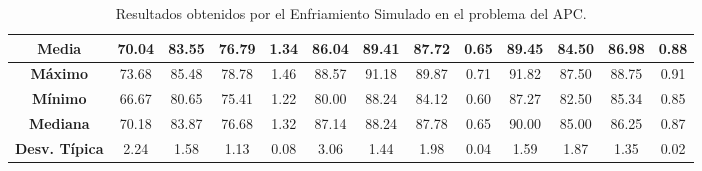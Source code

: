 \documentclass[11pt,a4paper]{article}
\begin{document}
\begin{table}[H]
{\begin{tabular}{c|c|c|c|c|c|c|c|c|c|c|c|c|}
\multicolumn{1}{|c|}{\textbf{Media}}        & 70.04                      & 83.55                   & 76.79                  & 1.34       & 86.04                      & 89.41                   & 87.72                  & 0.65       & 89.45                      & 84.50                   & 86.98                  & 0.88       \\ \hline
\multicolumn{1}{|c|}{\textbf{Máximo}}       & 73.68                      & 85.48                   & 78.78                  & 1.46       & 88.57                      & 91.18                   & 89.87                  & 0.71       & 91.82                      & 87.50                   & 88.75                  & 0.91       \\ \hline
\multicolumn{1}{|c|}{\textbf{Mínimo}}       & 66.67                      & 80.65                   & 75.41                  & 1.22       & 80.00                      & 88.24                   & 84.12                  & 0.60       & 87.27                      & 82.50                   & 85.34                  & 0.85       \\ \hline
\multicolumn{1}{|c|}{\textbf{Mediana}}      & 70.18                      & 83.87                   & 76.68                  & 1.32       & 87.14                      & 88.24                   & 87.78                  & 0.65       & 90.00                      & 85.00                   & 86.25                  & 0.87       \\ \hline
\multicolumn{1}{|c|}{\textbf{Desv. Típica}} & 2.24                       & 1.58                    & 1.13                   & 0.08       & 3.06                       & 1.44                    & 1.98                   & 0.04       & 1.59                       & 1.87                    & 1.35                   & 0.02       \\ \hline
\end{tabular}
}%
\caption{Resultados obtenidos por el Enfriamiento Simulado en el problema del APC.}
\end{table}
\end{document}

